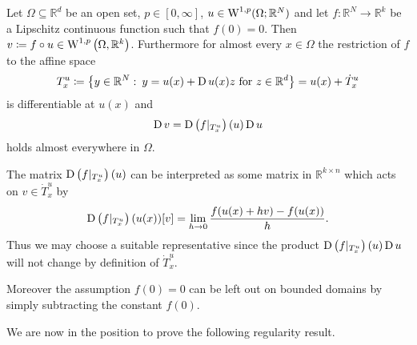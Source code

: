 \begin{theorem}
	\label{chain_rule_for_distributional_derivatives}
	Let $ \Omega \subseteq \mathbb{ R }^{ d } $ be an open set, $ p \in [0, \infty ] $, $ u \in \operatorname{W}^{ 1, p } ( \Omega ; \mathbb{ R }^{ N } ) $ and let $ f \colon \mathbb{ R }^{ N } \to \mathbb{ R }^{ k } $ be a Lipschitz continuous function such that $ f ( 0 ) = 0 $. Then $ v \coloneqq f \circ u \in \operatorname{W}^{ 1, p } \left( \Omega , \mathbb{ R }^{ k } \right) $. Furthermore for almost every $ x \in \Omega $ the restriction of $ f $ to the affine space 
	\begin{equation*}
		T_{ x }^{ u }
		\coloneqq
		\left\{
			y \in \mathbb{ R }^{ N }
			\, \colon \,
			y = u ( x ) + \operatorname{D} u ( x ) z 
			\text{ for }
			z \in \mathbb{ R }^{ d }
		\right\}
		=
		u( x ) 
		+
		\dot{ T }_{ x }^{ u }
	\end{equation*}
	is differentiable at $ u( x ) $ and
	\begin{equation*}
		\operatorname{D} v 
		=
		\operatorname{D} \left(
			f |_{ T_{ x }^{ u } }
		\right) ( u ) 
		\operatorname{D} u 
	\end{equation*}
	holds almost everywhere in $ \Omega $.
\end{theorem}
\begin{remark}
	The matrix 	
	$\operatorname{D} \left(
	f |_{ T_{ x }^{ u } }
	\right) ( u ) 
	$
	can be interpreted as some matrix in $ \mathbb{ R }^{ k \times n } $ which acts on $ v \in \dot{ T }_{ x }^{ u } $ by
	\begin{equation*}
		\operatorname{D} \left(
		f |_{ T_{ x }^{ u } }
		\right) ( u ( x ) ) 
		[ v ]
		=
		\lim_{ h \to 0 }
			\frac{ f ( u ( x ) + h v ) - f ( u ( x ) ) }{ h }.
	\end{equation*}
	Thus we may choose a suitable representative since the product $ \operatorname{D} \left(
	f |_{ T_{ x }^{ u } }
	\right) ( u )  
	\operatorname{D} u $
	will not change by definition of $ \dot{ T }_{ x }^{ u } $.
	
	Moreover the assumption $ f( 0 ) = 0 $ can be left out on bounded domains by simply subtracting the constant $ f( 0 ) $.
\end{remark}

We are now in the position to prove the following regularity result.

